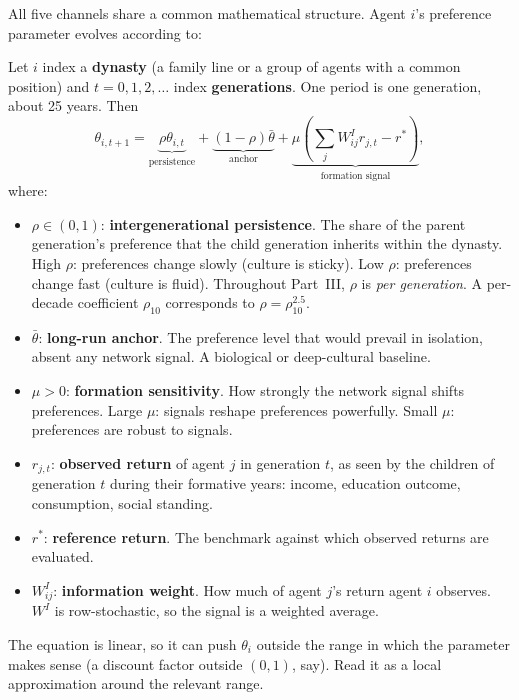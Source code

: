 \documentclass[../structural_economics_book.tex]{subfiles}
\begin{document}
All five channels share a common mathematical structure. Agent $i$'s preference parameter evolves according to:

\begin{definition}\label{ch09:def:formation}
Let $i$ index a \textbf{dynasty} (a family line or a group of agents with a common position) and $t = 0, 1, 2, \ldots$ index \textbf{generations}. One period is one generation, about 25 years. Then
\begin{equation}\label{ch09:eq:formation}
\theta_{i,t+1} = \underbrace{\rho \theta_{i,t}}_{\text{persistence}} + \underbrace{(1 - \rho)\bar{\theta}}_{\text{anchor}} + \underbrace{\mu \left(\sum_j W^I_{ij} r_{j,t} - r^*\right)}_{\text{formation signal}},
\end{equation}
where:
\begin{itemize}
\item $\rho \in (0, 1)$: \textbf{intergenerational persistence}. The share of the parent generation's preference that the child generation inherits within the dynasty. High $\rho$: preferences change slowly (culture is sticky). Low $\rho$: preferences change fast (culture is fluid). Throughout Part~III, $\rho$ is \textit{per generation}. A per-decade coefficient $\rho_{10}$ corresponds to $\rho = \rho_{10}^{2.5}$.
\item $\bar{\theta}$: \textbf{long-run anchor}. The preference level that would prevail in isolation, absent any network signal. A biological or deep-cultural baseline.
\item $\mu > 0$: \textbf{formation sensitivity}. How strongly the network signal shifts preferences. Large $\mu$: signals reshape preferences powerfully. Small $\mu$: preferences are robust to signals.
\item $r_{j,t}$: \textbf{observed return} of agent $j$ in generation $t$, as seen by the children of generation $t$ during their formative years: income, education outcome, consumption, social standing.
\item $r^*$: \textbf{reference return}. The benchmark against which observed returns are evaluated.
\item $W^I_{ij}$: \textbf{information weight}. How much of agent $j$'s return agent $i$ observes. $W^I$ is row-stochastic, so the signal is a weighted average.
\end{itemize}
The equation is linear, so it can push $\theta_i$ outside the range in which the parameter makes sense (a discount factor outside $(0,1)$, say). Read it as a local approximation around the relevant range.
\end{definition}
\end{document}
